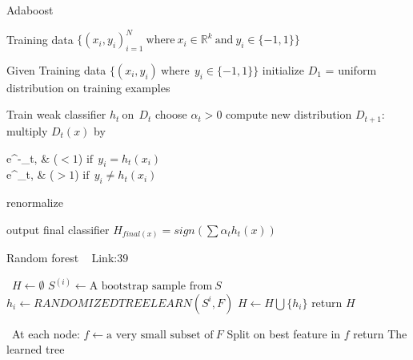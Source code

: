 \documentclass[a4paper]{article}
\begin{document}
  \begin{algorithm}
   \caption{Adaboost ~\cite{adaboostsecond}}
    \begin{algorithmic}[1]
    \INPUT 
    \Statex Training data $\{(x_i,y_i)_{i=1}^N \ \text{where}\ x_i \in  \mathbb{R}^k \ \text{and} \  y_i \in \{-1,1\} \}$
   
    \State Given Training data $\{(x_i,y_i) \ \text{where}\  \  y_i \in \{-1,1\} \}$
    \State initialize $D_1$ = uniform distribution on training examples
   
            \State Train weak classifier $h_t \  \text{on}\   \   D_t $
            \State choose $\alpha_t > 0 $
            \State compute new distribution $D_{t+1}$:
              \State multiply $D_t(x)$ by \begin{numcases}{}
  e^{-\alpha_t}, &  ($<1$) $ \text{if}\  \  y_i = h_t(x_i) $\\
   e^{\alpha_t}, & ($>1$) $ \text{if}\  \  y_i \neq h_t(x_i) $
\end{numcases}
\State renormalize
         \EndFor 
         
  \State output final classifier $H_{final(x)} = sign (\sum\alpha_t h_t(x))$
            
        
        
         
        
        \EndFor
        
       


\end{algorithmic}
\end{algorithm}

  


  \begin{algorithm}
   \caption{Random forest ~\cite{randomforest1} Link:{39} }
    \begin{algorithmic}[1]
      \
      \State $H \leftarrow  \emptyset $
            \State $S^{(i)}\leftarrow \text{A bootstrap sample from} \  S $
            \State $h_i \leftarrow RANDOMIZEDTREELEARN(S^{i},F)$
            \State $H \leftarrow H \bigcup \{h_i\}$
        \EndFor
        \State return $H$
        
        
         



 \EndFunction

  \ 
  \State At each node:
  \State $f \leftarrow \text{a very small subset of} \ F $
  \State Split on best feature in $f$
  \State return The learned tree
   \EndFunction

\end{algorithmic}
\end{algorithm}
\end{document}
